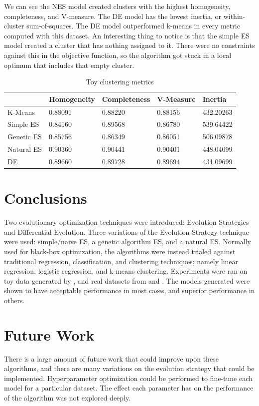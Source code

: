 \documentclass[conference]{IEEEtran}
\begin{document}
We can see the NES model created clusters with the highest homogeneity, completeness, and V-measure. The DE model has the lowest inertia, or 
within-cluster sum-of-squares. The DE model outperformed k-means in every metric computed with this dataset. An interesting thing to notice is that 
the simple ES model created a cluster that has nothing assigned to it. There were no constraints against this in the objective function, so the 
algorithm got stuck in a local optimum that includes that empty cluster.

\begin{table}[htbp]
\centering
\begin{tabular}{@{}lllll@{}}
\toprule
 & Homogeneity & Completeness & V-Measure & Inertia \\ \midrule
K-Means & 0.88091 & 0.88220 & 0.88156 & 432.20263 \\
Simple ES & 0.84160 & 0.89568 & 0.86780 & 539.64422 \\
Genetic ES & 0.85756 & 0.86349 & 0.86051 & 506.09878 \\
Natural ES & \cellcolor[HTML]{C0C0C0}0.90360 & \cellcolor[HTML]{C0C0C0}0.90441 & \cellcolor[HTML]{C0C0C0}0.90401 & 448.04099 \\
DE & 0.89660 & 0.89728 & 0.89694 & \cellcolor[HTML]{C0C0C0}431.09699 \\ \bottomrule
\end{tabular}
\caption{Toy clustering metrics}
\label{tab:toy-clus}
\end{table}

\section{Conclusions}
Two evolutionary optimization techniques were introduced: Evolution Strategies and Differential Evolution. Three variations of the 
Evolution Strategy technique were used: simple/naive ES, a genetic algorithm ES, and a natural ES. Normally used for black-box optimization, the 
algorithms were instead trialed against traditional regression, classification, and clustering techniques; namely linear regression, logistic 
regression, and k-means clustering. Experiments were ran on toy data generated by \cite{scikit}, and real datasets from \cite{molecules} and 
\cite{pulsar}. The models generated were shown to have acceptable performance in most cases, and superior performance in others. 

\section{Future Work}
There is a large amount of future work that could improve upon these algorithms, and there are many variations on the evolution strategy that 
could be implemented. Hyperparameter optimization could be performed to fine-tune each model for a particular dataset. The effect each parameter has 
on the performance of the algorithm was not explored deeply.
\end{document}

